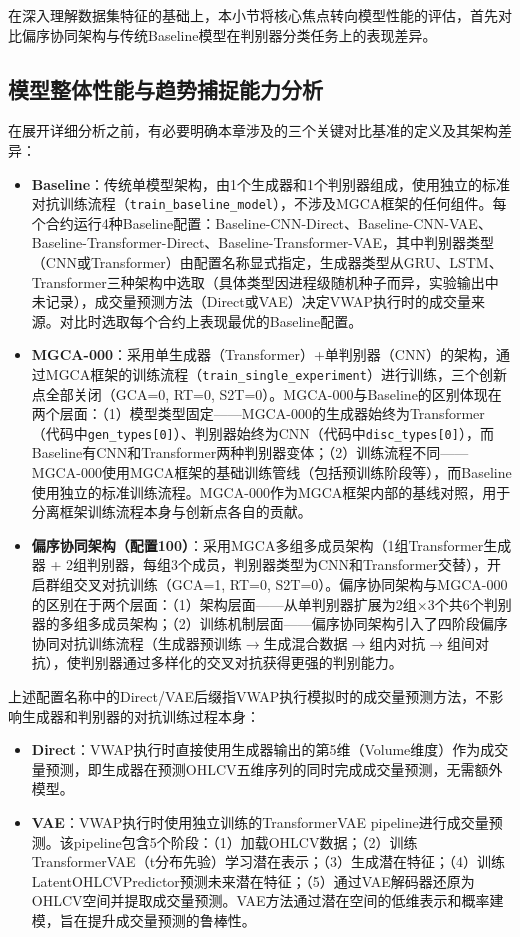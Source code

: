 在深入理解数据集特征的基础上，本小节将核心焦点转向模型性能的评估，首先对比偏序协同架构与传统Baseline模型在判别器分类任务上的表现差异。

\subsection{模型整体性能与趋势捕捉能力分析}

在展开详细分析之前，有必要明确本章涉及的三个关键对比基准的定义及其架构差异：

\begin{itemize}
\item \textbf{Baseline}：传统单模型架构，由1个生成器和1个判别器组成，使用独立的标准对抗训练流程（\texttt{train\_baseline\_model}），不涉及MGCA框架的任何组件。每个合约运行4种Baseline配置：Baseline-CNN-Direct、Baseline-CNN-VAE、Baseline-Transformer-Direct、Baseline-Transformer-VAE，其中判别器类型（CNN或Transformer）由配置名称显式指定，生成器类型从GRU、LSTM、Transformer三种架构中选取（具体类型因进程级随机种子而异，实验输出中未记录），成交量预测方法（Direct或VAE）决定VWAP执行时的成交量来源。对比时选取每个合约上表现最优的Baseline配置。
\item \textbf{MGCA-000}：采用单生成器（Transformer）+单判别器（CNN）的架构，通过MGCA框架的训练流程（\texttt{train\_single\_experiment}）进行训练，三个创新点全部关闭（GCA=0, RT=0, S2T=0）。MGCA-000与Baseline的区别体现在两个层面：（1）模型类型固定——MGCA-000的生成器始终为Transformer（代码中\texttt{gen\_types[0]}）、判别器始终为CNN（代码中\texttt{disc\_types[0]}），而Baseline有CNN和Transformer两种判别器变体；（2）训练流程不同——MGCA-000使用MGCA框架的基础训练管线（包括预训练阶段等），而Baseline使用独立的标准训练流程。MGCA-000作为MGCA框架内部的基线对照，用于分离框架训练流程本身与创新点各自的贡献。
\item \textbf{偏序协同架构（配置100）}：采用MGCA多组多成员架构（1组Transformer生成器 + 2组判别器，每组3个成员，判别器类型为CNN和Transformer交替），开启群组交叉对抗训练（GCA=1, RT=0, S2T=0）。偏序协同架构与MGCA-000的区别在于两个层面：（1）架构层面——从单判别器扩展为2组$\times$3个共6个判别器的多组多成员架构；（2）训练机制层面——偏序协同架构引入了四阶段偏序协同对抗训练流程（生成器预训练$\to$生成混合数据$\to$组内对抗$\to$组间对抗），使判别器通过多样化的交叉对抗获得更强的判别能力。
\end{itemize}

上述配置名称中的Direct/VAE后缀指VWAP执行模拟时的成交量预测方法，不影响生成器和判别器的对抗训练过程本身：
\begin{itemize}
\item \textbf{Direct}：VWAP执行时直接使用生成器输出的第5维（Volume维度）作为成交量预测，即生成器在预测OHLCV五维序列的同时完成成交量预测，无需额外模型。
\item \textbf{VAE}：VWAP执行时使用独立训练的TransformerVAE pipeline进行成交量预测。该pipeline包含5个阶段：（1）加载OHLCV数据；（2）训练TransformerVAE（t分布先验）学习潜在表示；（3）生成潜在特征；（4）训练LatentOHLCVPredictor预测未来潜在特征；（5）通过VAE解码器还原为OHLCV空间并提取成交量预测。VAE方法通过潜在空间的低维表示和概率建模，旨在提升成交量预测的鲁棒性。
\end{itemize}

